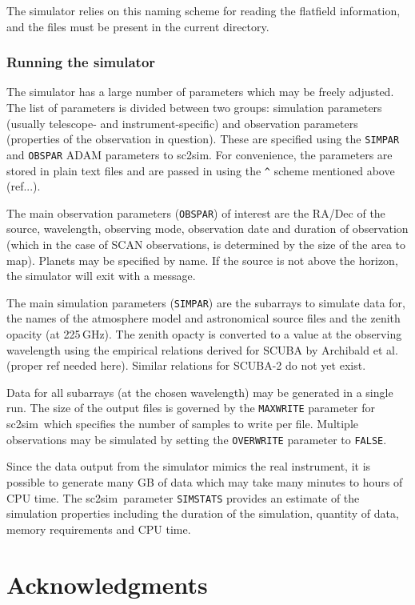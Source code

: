 \documentclass[twoside,11pt]{article}
\newcommand{\xref}[3]{#1}
\renewcommand{\_}{\texttt{\symbol{95}}}
\newcommand{\task}[1]{\textsf{#1}}
\newcommand{\sctwosim}{\xref{\task{sc2sim}}{sun258}{SC2SIM}}
\begin{document}
The simulator relies on this naming scheme for reading the flatfield
information, and the files must be present in the current directory.

\subsubsection{Running the simulator}

The simulator has a large number of parameters which may be freely
adjusted. The list of parameters is divided between two groups:
simulation parameters (usually telescope- and instrument-specific) and
observation parameters (properties of the observation in
question). These are specified using the \texttt{SIMPAR} and
\texttt{OBSPAR} ADAM parameters to \sctwosim. For convenience, the
parameters are stored in plain text files and are passed in using the
\verb+^+ scheme mentioned above (ref...).

The main observation parameters (\texttt{OBSPAR}) of interest are the
RA/Dec of the source, wavelength, observing mode, observation date and
duration of observation (which in the case of SCAN observations, is
determined by the size of the area to map). Planets may be specified
by name. If the source is not above the horizon, the simulator will
exit with a message.

The main simulation parameters (\texttt{SIMPAR}) are the subarrays to
simulate data for, the names of the atmosphere model and astronomical
source files and the zenith opacity (at 225\,GHz). The zenith opacty
is converted to a value at the observing wavelength using the
empirical relations derived for SCUBA by Archibald et al. (proper ref
needed here). Similar relations for SCUBA-2 do not yet exist.

Data for all subarrays (at the chosen wavelength) may be generated in
a single run. The size of the output files is governed by the
\texttt{MAXWRITE} parameter for \sctwosim\ which specifies the number
of samples to write per file. Multiple observations may be simulated
by setting the \texttt{OVERWRITE} parameter to \texttt{FALSE}.

Since the data output from the simulator mimics the real instrument,
it is possible to generate many GB of data which may take many minutes
to hours of CPU time. The \sctwosim\ parameter \texttt{SIMSTATS}
provides an estimate of the simulation properties including the
duration of the simulation, quantity of data, memory requirements and
CPU time.

\section{Acknowledgments}
\end{document}
